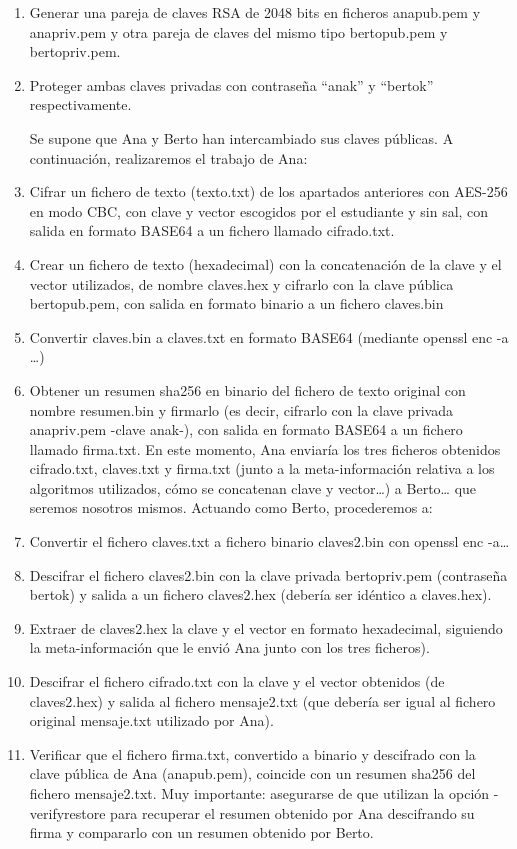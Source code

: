 \begin{enumerate}
    \item Generar una pareja de claves RSA de 2048 bits en ficheros anapub.pem y anapriv.pem y otra
    pareja de claves del mismo tipo bertopub.pem y bertopriv.pem.
    \item Proteger ambas claves privadas con contraseña “anak” y “bertok” respectivamente.

Se supone que Ana y Berto han intercambiado sus claves públicas. A continuación, realizaremos el trabajo de Ana:
    \item Cifrar un fichero de texto (texto.txt) de los apartados anteriores con AES-256 en modo CBC,
con clave y vector escogidos por el estudiante y sin sal, con salida en formato BASE64 a un
fichero llamado cifrado.txt.
    \item Crear un fichero de texto (hexadecimal) con la concatenación de la clave y el vector
utilizados, de nombre claves.hex y cifrarlo con la clave pública bertopub.pem, con salida en formato binario a un fichero claves.bin
    \item Convertir claves.bin a claves.txt en formato BASE64 (mediante openssl enc -a …)
    \item Obtener un resumen sha256 en binario del fichero de texto original con nombre resumen.bin
y firmarlo (es decir, cifrarlo con la clave privada anapriv.pem -clave anak-), con salida en formato BASE64 a un fichero llamado firma.txt.
En este momento, Ana enviaría los tres ficheros obtenidos cifrado.txt, claves.txt y firma.txt (junto a
la meta-información relativa a los algoritmos utilizados, cómo se concatenan clave y vector…) a
Berto… que seremos nosotros mismos. Actuando como Berto, procederemos a:
    \item Convertir el fichero claves.txt a fichero binario claves2.bin con openssl enc -a…
    \item Descifrar el fichero claves2.bin con la clave privada bertopriv.pem (contraseña bertok) y salida a un fichero claves2.hex (debería ser idéntico a claves.hex).
    \item Extraer de claves2.hex la clave y el vector en formato hexadecimal, siguiendo la meta-información que le envió Ana junto con los tres ficheros).
    \item Descifrar el fichero cifrado.txt con la clave y el vector obtenidos (de claves2.hex) y salida al fichero mensaje2.txt (que debería ser igual al fichero original mensaje.txt utilizado por Ana).
    \item Verificar que el fichero firma.txt, convertido a binario y descifrado con la clave pública de Ana (anapub.pem), coincide con un resumen sha256 del fichero mensaje2.txt. Muy importante: asegurarse de que utilizan la opción -verifyrestore para recuperar el resumen obtenido por Ana descifrando su firma y compararlo con un resumen obtenido por Berto.
\end{enumerate} 